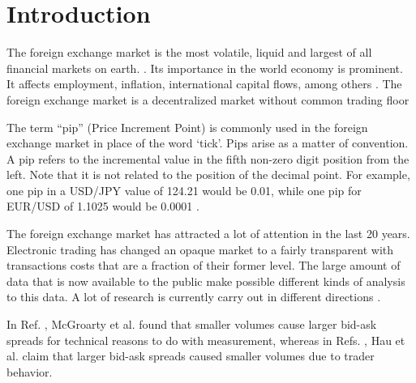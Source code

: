 \section{Introduction}\label{sec:introduction}

The foreign exchange market is the most volatile, liquid and largest of all
financial markets on earth.
\cite{forex_liquidity,info_forex,forex_market_micro,intraday_forex}. Its
importance in the world economy is prominent. It affects employment, inflation,
international capital flows, among others \cite{forex_structure}. The foreign
exchange market is a decentralized market without common trading floor
\cite{teach_spread,forex_structure,info_forex,forex_market_micro}

The term ``pip'' (Price Increment Point) is commonly used in the foreign
exchange market in place of the word ‘tick’. Pips arise as a matter of
convention. A pip refers to the incremental value in the fifth non-zero digit
position from the left. Note that it is not related to the position of the
decimal point. For example, one pip in a USD/JPY value of 124.21 would be 0.01,
while one pip for EUR/USD of 1.1025 would be 0.0001
\cite{order_flow_forex,forex_structure,micro_eff,forex_market_micro}.

The foreign exchange market has attracted a lot of attention in the last 20
years. Electronic trading has changed an opaque market to a fairly transparent
with transactions costs that are a fraction of their former level. The large
amount of data that is now available to the public make possible different
kinds of analysis to this data. A lot of research is currently carry out in
different directions
\cite{curr_speculation,forex_algorithmic,teach_spread,electronic_forex,forex_microstructure,patterns_forex,eur_change_forex,spread_competition,forex_structure,political_forex,forex_liquidity,forex_volatility,info_forex,local_forex,intraday_forex,forex_inefficiency}.

In Ref. \cite{micro_eff}, McGroarty et al. found that smaller volumes cause
larger bid-ask spreads for technical reasons to do with measurement, whereas in
Refs. \cite{eur_int_curr,eur_change_forex}, Hau et al. claim that larger
bid-ask spreads caused smaller volumes due to trader behavior.

